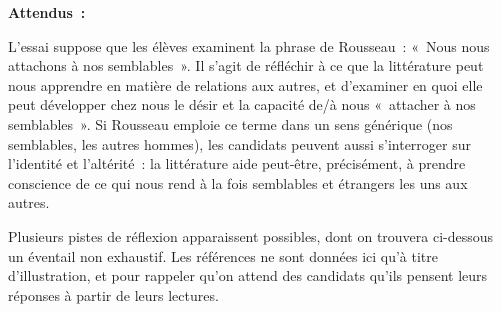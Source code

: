 {\textbf{Attendus~:}

L'essai suppose que les élèves examinent la phrase de Rousseau~: «~Nous nous
attachons à nos semblables~». Il s'agit de réfléchir à ce que la littérature peut nous
apprendre en matière de relations aux autres, et d'examiner en quoi elle peut
développer chez nous le désir et la capacité de/à nous «~attacher à nos semblables~».
Si Rousseau emploie ce terme dans un sens générique (nos semblables, les autres
hommes), les candidats peuvent aussi s'interroger sur l'identité et l'altérité~: la
littérature aide peut-être, précisément, à prendre conscience de ce qui nous rend à la
fois semblables et étrangers les uns aux autres.

Plusieurs pistes de réflexion apparaissent possibles, dont on trouvera ci-dessous un
éventail non exhaustif. Les références ne sont données ici qu'à titre d'illustration, et
pour rappeler qu'on attend des candidats qu'ils pensent leurs réponses à partir de leurs
lectures.

}
